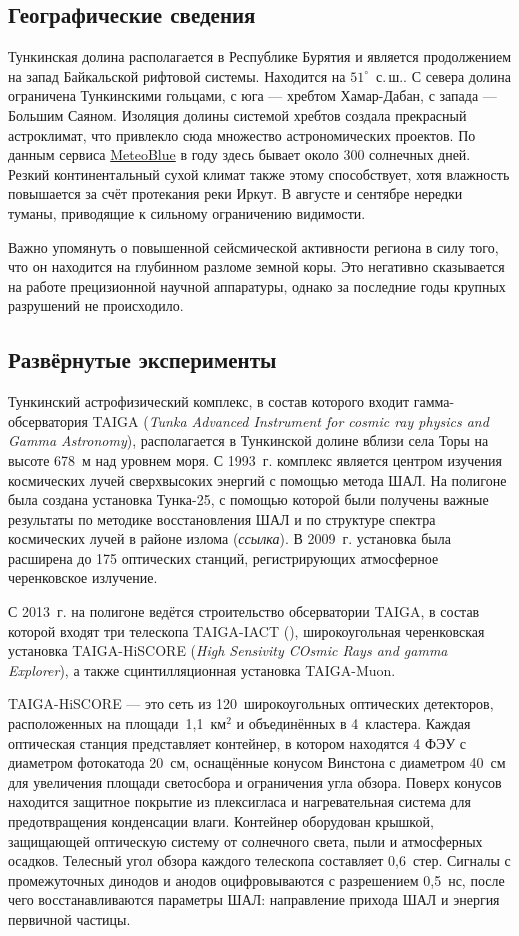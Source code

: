 \documentclass[magd,floatypics,numeref]{msudipl} %
\begin{document}
\subsection{Географические сведения}
Тункинская долина располагается в Республике Бурятия и является продолжением на запад Байкальской рифтовой системы.  Находится на $51^{\circ}$~с.\,ш.. С севера долина ограничена Тункинскими гольцами, с юга --- хребтом Хамар-Дабан, с запада --- Большим Саяном. Изоляция долины системой хребтов создала прекрасный астроклимат, что привлекло сюда множество астрономических проектов. По данным сервиса \href{https://www.meteoblue.com}{MeteoBlue}
в году здесь бывает около 300 солнечных дней. Резкий континентальный сухой климат также этому способствует, хотя влажность повышается за счёт протекания реки Иркут. В августе и сентябре нередки туманы, приводящие к сильному ограничению видимости. 

Важно упомянуть о повышенной сейсмической активности региона в силу того, что он находится на глубинном разломе земной коры. Это негативно сказывается на работе прецизионной научной аппаратуры, однако за последние годы крупных разрушений не происходило.
\subsection{Развёрнутые эксперименты}
Тункинский астрофизический комплекс, в состав которого входит гамма-обсерватория TAIGA (\textit{Tunka Advanced Instrument for cosmic ray physics and Gamma Astronomy}), располагается в Тункинской долине вблизи села Торы на высоте 678~м над уровнем моря. С 1993~г. комплекс является центром изучения космических лучей сверхвысоких энергий с помощью метода ШАЛ. На полигоне была создана установка Тунка-25, с помощью которой были получены важные результаты по методике восстановления ШАЛ и по структуре спектра космических лучей в районе излома (\textit{ссылка}). В 2009~г. установка была расширена до 175 оптических станций, регистрирующих атмосферное черенковское излучение. 

С 2013~г. на полигоне ведётся строительство обсерватории TAIGA, в состав которой входят три телескопа TAIGA-IACT (), широкоугольная черенковская установка TAIGA-HiSCORE (\textit{High Sensivity COsmic Rays and gamma Explorer}), а также сцинтилляционная установка TAIGA-Muon.

TAIGA-HiSCORE --- это сеть из 120~широкоугольных оптических детекторов, расположенных на площади~1{,}1~км$^\text{2}$ и объединённых в 4~кластера. Каждая оптическая станция представляет контейнер, в котором находятся 4 ФЭУ с диаметром фотокатода 20~см, оснащённые конусом Винстона с диаметром 40~см для увеличения площади светосбора и ограничения угла обзора. Поверх конусов находится защитное покрытие из плексигласа и нагревательная система для предотвращения конденсации влаги. Контейнер оборудован крышкой, защищающей оптическую систему от солнечного света, пыли и атмосферных осадков. Телесный угол обзора каждого телескопа составляет 0{,}6~стер. Сигналы с промежуточных динодов и анодов оцифровываются с разрешением 0{,}5~нс, после чего восстанавливаются параметры ШАЛ: направление прихода ШАЛ и энергия первичной частицы. 
\end{document}
